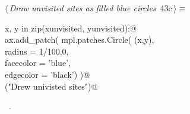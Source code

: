 \documentclass[11.5pt]{report}
\begin{document}
\begin{flushleft} \small\label{scrap57}\raggedright\small
{} $\langle\,${\itshape Draw unvisited sites as filled blue circles}\nobreak\ {\footnotesize {43c}}$\,\rangle\equiv$
\vspace{-1ex}
\begin{list}{}{} \item
\mbox{}\verb@for x, y in zip(xunvisited, yunvisited):@\\
\mbox{}\verb@     ax.add_patch( mpl.patches.Circle( (x,y),\@\\
\mbox{}\verb@                                    radius    = 1/100.0,\@\\
\mbox{}\verb@                                    facecolor = 'blue',\@\\
\mbox{}\verb@                                    edgecolor = 'black')  )@\\
\mbox{}\verb@debug("Drew univisted sites")@\\
\mbox{}\verb@@{\NWsep}
\end{list}
\vspace{-1.5ex}
\footnotesize
\begin{list}{}{\setlength{\itemsep}{-\parsep}\setlength{\itemindent}{-\leftmargin}}
\item \NWtxtMacroRefIn\ .

\item{}
\end{list}
\vspace{4ex}
\end{flushleft}


\vspace{-0.8cm}\newchunk 
\end{document}
